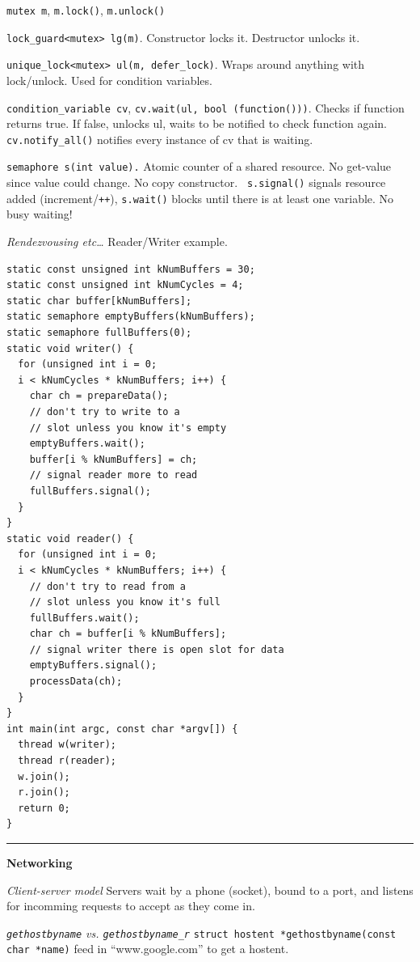 \documentclass{article}
\begin{document}
\begin{multicols}{2}
  {\tt mutex m}, {\tt m.lock()}, {\tt m.unlock()}

  {\tt lock\_guard<mutex> lg(m)}. Constructor locks it. Destructor unlocks it.

  {\tt unique\_lock<mutex> ul(m, defer\_lock)}. Wraps around anything with
  lock/unlock. Used for condition variables.

  {\tt condition\_variable cv}, {\tt cv.wait(ul, bool (function()))}. Checks if
  function returns true. If false, unlocks ul, waits to be notified to check
  function again. {\tt cv.notify\_all()} notifies every instance of cv that is
  waiting.

  {\tt semaphore s(int value).} Atomic counter of a shared resource. No
  get-value since value could change. No copy constructor. {\tt
  s.signal()} signals resource added (increment/\texttt{++}), {\tt s.wait()}
  blocks until there is at least one variable. No busy waiting!

  {\it Rendezvousing etc\ldots} Reader/Writer example.
  \begin{verbatim}
static const unsigned int kNumBuffers = 30;
static const unsigned int kNumCycles = 4;
static char buffer[kNumBuffers];
static semaphore emptyBuffers(kNumBuffers);
static semaphore fullBuffers(0);
static void writer() {
  for (unsigned int i = 0;
  i < kNumCycles * kNumBuffers; i++) {
    char ch = prepareData();
    // don't try to write to a
    // slot unless you know it's empty
    emptyBuffers.wait();
    buffer[i % kNumBuffers] = ch;
    // signal reader more to read
    fullBuffers.signal();
  }
}
static void reader() {
  for (unsigned int i = 0;
  i < kNumCycles * kNumBuffers; i++) {
    // don't try to read from a
    // slot unless you know it's full
    fullBuffers.wait();
    char ch = buffer[i % kNumBuffers];
    // signal writer there is open slot for data
    emptyBuffers.signal();
    processData(ch);
  }
}
int main(int argc, const char *argv[]) {
  thread w(writer);
  thread r(reader);
  w.join();
  r.join();
  return 0;
} \end{verbatim}
\noindent\rule{4cm}{0.4pt}

  {\bf Networking}

  {\it Client-server model} Servers wait by a phone (socket), bound to a port,
  and listens for incomming requests to accept as they come in.

  {\it {\tt gethostbyname} vs. {\tt gethostbyname\_r}}
  {\tt struct hostent *gethostbyname(const char *name)} feed in
  ``www.google.com'' to get a hostent.


\end{multicols}
\end{document}
